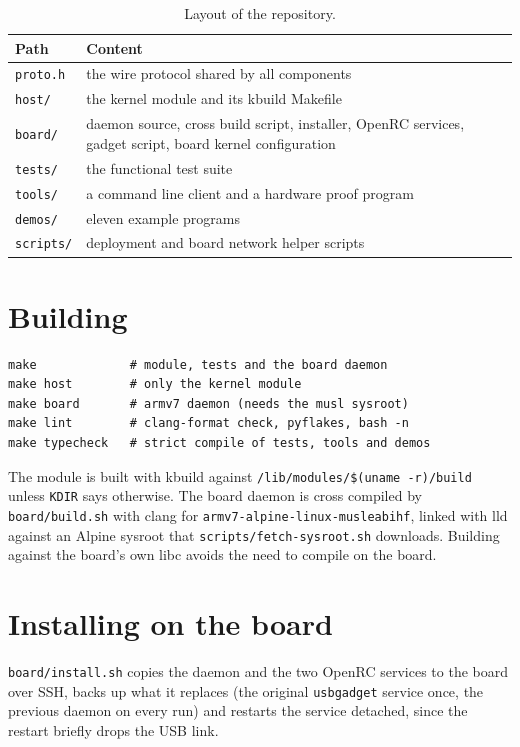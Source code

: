 \documentclass[11pt,a4paper,oneside]{report}
\newcommand{\code}[1]{\texttt{\small #1}}
\begin{document}
\begin{table}[ht]
\centering
\begin{tabularx}{\textwidth}{lX}
\toprule
Path & Content \\
\midrule
\code{proto.h} & the wire protocol shared by all components \\
\code{host/} & the kernel module and its kbuild Makefile \\
\code{board/} & daemon source, cross build script, installer, OpenRC services, gadget script, board kernel configuration \\
\code{tests/} & the functional test suite \\
\code{tools/} & a command line client and a hardware proof program \\
\code{demos/} & eleven example programs \\
\code{scripts/} & deployment and board network helper scripts \\
\bottomrule
\end{tabularx}
\caption{Layout of the repository.}
\end{table}

\section{Building}

\begin{lstlisting}[style=shell]
make             # module, tests and the board daemon
make host        # only the kernel module
make board       # armv7 daemon (needs the musl sysroot)
make lint        # clang-format check, pyflakes, bash -n
make typecheck   # strict compile of tests, tools and demos
\end{lstlisting}

The module is built with kbuild against \code{/lib/modules/\$(uname -r)/build} unless \code{KDIR} says otherwise. The board daemon is cross compiled by \code{board/build.sh} with clang for \code{armv7-alpine-linux-musleabihf}, linked with lld against an Alpine sysroot that \code{scripts/fetch-sysroot.sh} downloads. Building against the board's own libc avoids the need to compile on the board.

\section{Installing on the board}

\code{board/install.sh} copies the daemon and the two OpenRC services to the board over SSH, backs up what it replaces (the original \code{usbgadget} service once, the previous daemon on every run) and restarts the service detached, since the restart briefly drops the USB link.
\end{document}
